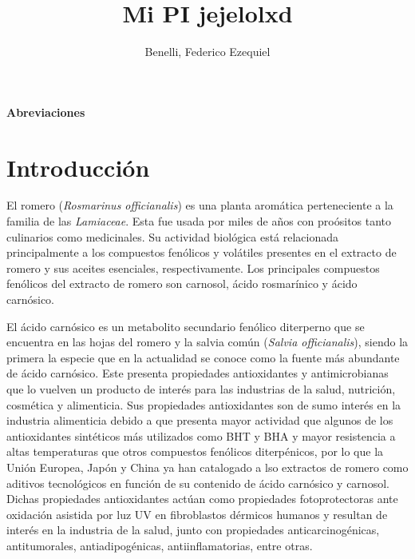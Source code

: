 \documentclass[11pt,a4paper]{article}
\title{Mi PI jejelolxd}
\author{Benelli, Federico Ezequiel}
\begin{document}
\newenvironment{descriptionB}
{
\begin{description}[style=nextline,leftmargin=10mm,topsep=0mm,noitemsep]
}
{\end{description}}

\maketitle
\tableofcontents
\newpage

\textbf{\Large Abreviaciones}





\newpage

\section{Introducción}

El romero (\emph{Rosmarinus officianalis}) es una planta aromática perteneciente a la familia de las \emph{Lamiaceae}.
Esta fue usada por miles de años con proósitos tanto culinarios como medicinales.
Su actividad biológica está relacionada principalmente a los compuestos fenólicos y volátiles presentes en el extracto de romero y sus aceites esenciales, respectivamente.
Los principales compuestos fenólicos del extracto de romero son carnosol, ácido rosmarínico y ácido carnósico.

El ácido carnósico es un metabolito secundario fenólico diterperno que se encuentra en las hojas del romero y la salvia común (\emph{Salvia officianalis}), siendo la primera la especie que en la actualidad se conoce como la fuente más abundante de ácido carnósico.
Este presenta propiedades antioxidantes y antimicrobianas que lo vuelven un producto de interés para las industrias de la salud, nutrición, cosmética y alimenticia.
Sus propiedades antioxidantes son de sumo interés en la industria alimenticia debido a que presenta mayor actividad que algunos de los antioxidantes sintéticos más utilizados como \ac{BHT} y \ac{BHA} y mayor resistencia a altas temperaturas que otros compuestos fenólicos diterpénicos, por lo que la Unión Europea, Japón y China ya han catalogado a lso extractos de romero como aditivos tecnológicos en función de su contenido de ácido carnósico y carnosol.
Dichas propiedades antioxidantes actúan como propiedades fotoprotectoras ante oxidación asistida por luz \ac{UV} en fibroblastos dérmicos humanos y resultan de interés en la industria de la salud, junto con propiedades anticarcinogénicas, antitumorales, antiadipogénicas, antiinflamatorias, entre otras.
\end{document}

